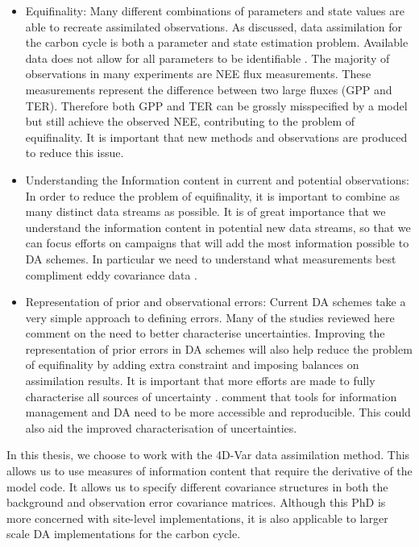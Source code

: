 \begin{itemize}

\item Equifinality: Many different combinations of parameters and state values are able to recreate assimilated observations. As discussed, data assimilation for the carbon cycle is both a parameter and state estimation problem. Available data does not allow for all parameters to be identifiable \citep{Luo2009}. The majority of observations in many experiments are NEE flux measurements. These measurements represent the difference between two large fluxes (GPP and TER). Therefore both GPP and TER can be grossly misspecified by a model but still achieve the observed NEE, contributing to the problem of equifinality. It is important that new methods and observations are produced to reduce this issue.

\item Understanding the Information content in current and potential observations: In order to reduce the problem of equifinality, it is important to combine as many distinct data streams as possible. It is of great importance that we understand the information content in potential new data streams, so that we can focus efforts on campaigns that will add the most information possible to DA schemes. In particular we need to understand what measurements best compliment eddy covariance data \citep{rayner2010current, williams2009improving}.

\item Representation of prior and observational errors: Current DA schemes take a very simple approach to defining errors. Many of the studies reviewed here comment on the need to better characterise uncertainties. Improving the representation of prior errors in DA schemes will also help reduce the problem of equifinality by adding extra constraint and imposing balances on assimilation results. It is important that more efforts are made to fully characterise all sources of uncertainty \citep{Keenan2011, raupach2005model}. \citet{Dietze2013} comment that tools for information management and DA need to be more accessible and reproducible. This could also aid the improved characterisation of uncertainties.
\end{itemize}

In this thesis, we choose to work with the 4D-Var data assimilation method. This allows us to use measures of information content that require the derivative of the model code. It allows us to specify different covariance structures in both the background and observation error covariance matrices. Although this PhD is more concerned with site-level implementations, it is also applicable to larger scale DA implementations for the carbon cycle. 

